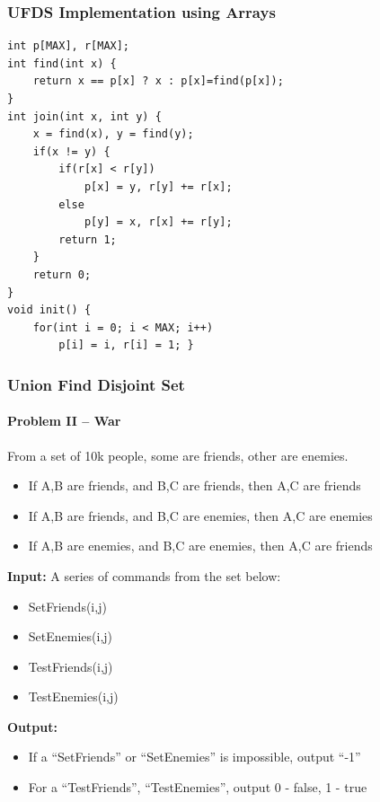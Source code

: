 \begin{frame}[fragile]
  \frametitle{UFDS Implementation using Arrays}

  {\small
\begin{verbatim}
int p[MAX], r[MAX];
int find(int x) {
    return x == p[x] ? x : p[x]=find(p[x]);
}
int join(int x, int y) {
    x = find(x), y = find(y);
    if(x != y) {
        if(r[x] < r[y])
            p[x] = y, r[y] += r[x];
        else
            p[y] = x, r[x] += r[y];
        return 1;
    }
    return 0;
}
void init() {
    for(int i = 0; i < MAX; i++)
        p[i] = i, r[i] = 1; }

\end{verbatim}
}

\end{frame}

\begin{frame}
  \frametitle{Union Find Disjoint Set}
  \framesubtitle{Problem II -- War}
  {\small
  \begin{block}{}
    From a set of 10k people, some are friends, other are enemies.
    \begin{itemize}
      \item If A,B are friends, and B,C are friends, then A,C are friends
      \item If A,B are friends, and B,C are enemies, then A,C are enemies
      \item If A,B are enemies, and B,C are enemies, then A,C are friends
    \end{itemize}

    {\bf Input:} A series of commands from the set below:
    \begin{itemize}
    \item SetFriends(i,j)
    \item SetEnemies(i,j)
    \item TestFriends(i,j)
    \item TestEnemies(i,j)
    \end{itemize}

    {\bf Output:}
    \begin{itemize}
    \item If a ``SetFriends'' or ``SetEnemies'' is impossible, output ``-1''
    \item For a ``TestFriends'', ``TestEnemies'', output 0 - false, 1 - true
    \end{itemize}
  \end{block}}

\end{frame}

